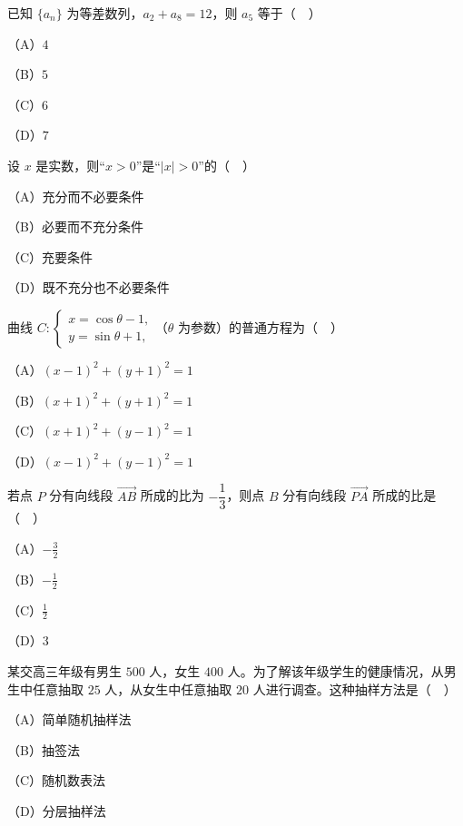 


\begin{question}
已知 $\{a_n\}$ 为等差数列，$a_2+a_8=12$，则 $a_5$ 等于（　）

（A）$4$

（B）$5$

（C）$6$

（D）$7$

\end{question}
\begin{question}
设 $x$ 是实数，则“$x>0$”是“$|x|>0$”的（　）

（A）充分而不必要条件

（B）必要而不充分条件

（C）充要条件

（D）既不充分也不必要条件

\end{question}
\begin{question}
曲线 $C:\begin{cases}x=\cos\theta-1,\\ y=\sin\theta+1,\end{cases}$（$\theta$ 为参数）的普通方程为（　）

（A）$(x-1)^2+(y+1)^2=1$

（B）$(x+1)^2+(y+1)^2=1$

（C）$(x+1)^2+(y-1)^2=1$

（D）$(x-1)^2+(y-1)^2=1$

\end{question}
\begin{question}
若点 $P$ 分有向线段 $\overrightarrow{AB}$ 所成的比为 $-\dfrac13$，则点 $B$ 分有向线段 $\overrightarrow{PA}$ 所成的比是（　）

（A）$-\frac32$

（B）$-\frac12$

（C）$\frac12$

（D）$3$

\end{question}
\begin{question}
某交高三年级有男生 $500$ 人，女生 $400$ 人。为了解该年级学生的健康情况，从男生中任意抽取 $25$ 人，从女生中任意抽取 $20$ 人进行调查。这种抽样方法是（　）

（A）简单随机抽样法

（B）抽签法

（C）随机数表法

（D）分层抽样法

\end{question}
